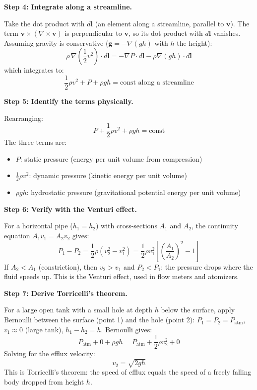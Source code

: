 \textbf{Step 4: Integrate along a streamline.}

Take the dot product with $d\mathbf{l}$ (an element along a streamline, parallel to $\mathbf{v}$). The term $\mathbf{v}\times(\nabla\times\mathbf{v})$ is perpendicular to $\mathbf{v}$, so its dot product with $d\mathbf{l}$ vanishes. Assuming gravity is conservative ($\mathbf{g} = -\nabla(gh)$ with $h$ the height):
\begin{equation}
\rho\,\nabla\left(\frac{1}{2}v^2\right)\cdot d\mathbf{l} = -\nabla P\cdot d\mathbf{l} - \rho\nabla(gh)\cdot d\mathbf{l}
\end{equation}
which integrates to:
\begin{equation}
\frac{1}{2}\rho v^2 + P + \rho gh = \text{const along a streamline}
\end{equation}

\textbf{Step 5: Identify the terms physically.}

Rearranging:
\begin{equation}
P + \frac{1}{2}\rho v^2 + \rho gh = \text{const}
\end{equation}
The three terms are:
\begin{itemize}
\item $P$: static pressure (energy per unit volume from compression)
\item $\frac{1}{2}\rho v^2$: dynamic pressure (kinetic energy per unit volume)
\item $\rho gh$: hydrostatic pressure (gravitational potential energy per unit volume)
\end{itemize}

\textbf{Step 6: Verify with the Venturi effect.}

For a horizontal pipe ($h_1 = h_2$) with cross-sections $A_1$ and $A_2$, the continuity equation $A_1 v_1 = A_2 v_2$ gives:
\begin{equation}
P_1 - P_2 = \frac{1}{2}\rho(v_2^2 - v_1^2) = \frac{1}{2}\rho v_1^2\left[\left(\frac{A_1}{A_2}\right)^2 - 1\right]
\end{equation}
If $A_2 < A_1$ (constriction), then $v_2 > v_1$ and $P_2 < P_1$: the pressure drops where the fluid speeds up. This is the Venturi effect, used in flow meters and atomizers.

\textbf{Step 7: Derive Torricelli's theorem.}

For a large open tank with a small hole at depth $h$ below the surface, apply Bernoulli between the surface (point 1) and the hole (point 2): $P_1 = P_2 = P_{\text{atm}}$, $v_1 \approx 0$ (large tank), $h_1 - h_2 = h$. Bernoulli gives:
\begin{equation}
P_{\text{atm}} + 0 + \rho gh = P_{\text{atm}} + \frac{1}{2}\rho v_2^2 + 0
\end{equation}
Solving for the efflux velocity:
\begin{equation}
v_2 = \sqrt{2gh}
\end{equation}
This is Torricelli's theorem: the speed of efflux equals the speed of a freely falling body dropped from height $h$.

